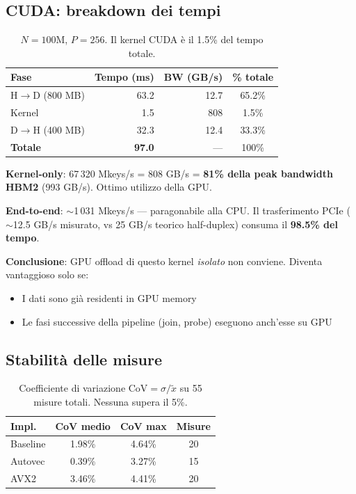 \documentclass[11pt,a4paper]{article}
\begin{document}
\subsection{CUDA: breakdown dei tempi}

\begin{table}[h]
\centering
\begin{tabular}{@{}lrrc@{}}
\toprule
\textbf{Fase} & \textbf{Tempo (ms)} & \textbf{BW (GB/s)} & \textbf{\% totale} \\
\midrule
H$\to$D (800 MB) & 63.2 & 12.7 & 65.2\% \\
Kernel           &  1.5 & 808  &  1.5\% \\
D$\to$H (400 MB) & 32.3 & 12.4 & 33.3\% \\
\midrule
\textbf{Totale}  & \textbf{97.0} & --- & 100\% \\
\bottomrule
\end{tabular}
\caption{$N=100$M, $P=256$. Il kernel CUDA è il 1.5\% del tempo totale.}
\end{table}

\textbf{Kernel-only}: 67\,320 Mkeys/s = 808 GB/s = \textbf{81\% della peak bandwidth HBM2} (993 GB/s). Ottimo utilizzo della GPU.

\textbf{End-to-end}: $\sim$1\,031 Mkeys/s --- paragonabile alla CPU. Il trasferimento PCIe ($\sim$12.5 GB/s misurato, vs 25 GB/s teorico half-duplex) consuma il \textbf{98.5\% del tempo}.

\textbf{Conclusione}: GPU offload di questo kernel \emph{isolato} non conviene. Diventa vantaggioso solo se:
\begin{itemize}
    \item I dati sono già residenti in GPU memory
    \item Le fasi successive della pipeline (join, probe) eseguono anch'esse su GPU
\end{itemize}


\subsection{Stabilità delle misure}

\begin{table}[h]
\centering
\begin{tabular}{@{}lccc@{}}
\toprule
\textbf{Impl.} & \textbf{CoV medio} & \textbf{CoV max} & \textbf{Misure} \\
\midrule
Baseline & 1.98\% & 4.64\% & 20 \\
Autovec  & 0.39\% & 3.27\% & 15 \\
AVX2     & 3.46\% & 4.41\% & 20 \\
\bottomrule
\end{tabular}
\caption{Coefficiente di variazione $\text{CoV} = \sigma / \tilde{x}$ su 55 misure totali. Nessuna supera il 5\%.}
\end{table}
\end{document}
